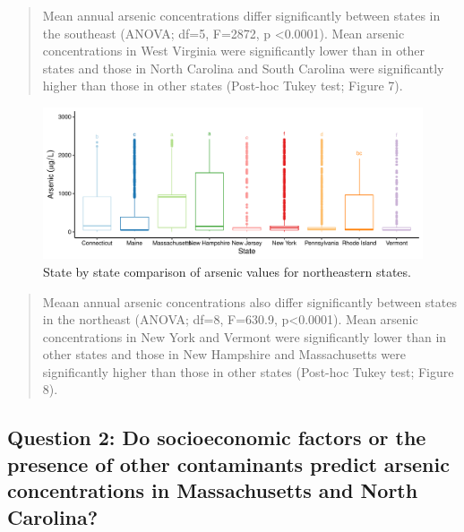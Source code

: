 \documentclass[12pt,]{article}
\begin{document}
\begin{quote}
Mean annual arsenic concentrations differ significantly between states
in the southeast (ANOVA; df=5, F=2872, p \textless{}0.0001). Mean
arsenic concentrations in West Virginia were significantly lower than in
other states and those in North Carolina and South Carolina were
significantly higher than those in other states (Post-hoc Tukey test;
Figure 7).
\end{quote}

\newpage

\begin{figure}
\centering
\includegraphics{Project_Template_files/figure-latex/figs8-1.pdf}
\caption{State by state comparison of arsenic values for northeastern
states.}
\end{figure}

\begin{quote}
Meaan annual arsenic concentrations also differ significantly between
states in the northeast (ANOVA; df=8, F=630.9, p\textless{}0.0001). Mean
arsenic concentrations in New York and Vermont were significantly lower
than in other states and those in New Hampshire and Massachusetts were
significantly higher than those in other states (Post-hoc Tukey test;
Figure 8).
\end{quote}

\newpage

\hypertarget{question-2-do-socioeconomic-factors-or-the-presence-of-other-contaminants-predict-arsenic-concentrations-in-massachusetts-and-north-carolina}{%
\subsection{Question 2: Do socioeconomic factors or the presence of
other contaminants predict arsenic concentrations in Massachusetts and
North
Carolina?}\label{question-2-do-socioeconomic-factors-or-the-presence-of-other-contaminants-predict-arsenic-concentrations-in-massachusetts-and-north-carolina}}
\end{document}
